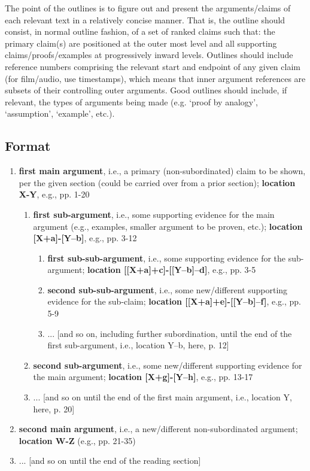 \documentclass[12pt]{article}
\begin{document}
The point of the outlines is to figure out and present the arguments/claims of each relevant text in a relatively concise manner. That is, the outline should consist, in normal outline fashion, of a set of ranked claims such that: the primary claim(s) are positioned at the outer most level and all supporting claims/proofs/examples at progressively inward levels. Outlines should include reference numbers comprising the relevant start and endpoint of any given claim (for film/audio, use timestamps), which means that inner argument references are subsets of their controlling outer arguments. Good outlines should include, if relevant, the types of arguments being made (e.g. `proof by analogy', `assumption', `example', etc.).

\renewcommand{\labelenumi}{(\Roman{enumi})}
\renewcommand{\labelenumii}{(\Alph{enumii})}
\renewcommand{\labelenumiii}{(\roman{enumiii})}
\renewcommand{\labelenumiV}{(\alph{enumiV})}
\renewcommand{\labelenumV}{(\alph{enumV})}

\subsection{Format}
\begin{small}
\begin{enumerate}
\item \textbf{first main argument}, i.e., a primary (non-subordinated) claim to be shown, per the given section (could be carried over from a prior section); \textbf{location X-Y}, e.g., pp. 1-20
    \begin{enumerate}
    \item \textbf{first sub-argument}, i.e., some supporting evidence for the main argument (e.g., examples, smaller argument to be proven, etc.); \textbf{location [X+a]-[Y--b]}, e.g., pp. 3-12
        \begin{enumerate}
        \item \textbf{first sub-sub-argument}, i.e., some supporting evidence for the sub-argument; \textbf{location [[X+a]+c]-[[Y--b]--d]}, e.g., pp. 3-5
        \item \textbf{second sub-sub-argument}, i.e., some new/different supporting evidence for the sub-claim; \textbf{location [[X+a]+e]-[[Y--b]--f]}, e.g., pp. 5-9
        \item ... [and so on, including further subordination, until the end of the first sub-argument, i.e., location Y--b, here, p. 12]
        \end{enumerate}
    \item \textbf{second sub-argument}, i.e., some new/different supporting evidence for the main argument; \textbf{location [X+g]-[Y--h]}, e.g., pp. 13-17
    \item ... [and so on until the end of the first main argument, i.e., location Y, here, p. 20]
    \end{enumerate}
\item \textbf{second main argument}, i.e., a new/different non-subordinated argument; \textbf{location W-Z} (e.g., pp. 21-35)
\item ... [and so on until the end of the reading section]
\end{enumerate}
\end{small}
\end{document}

